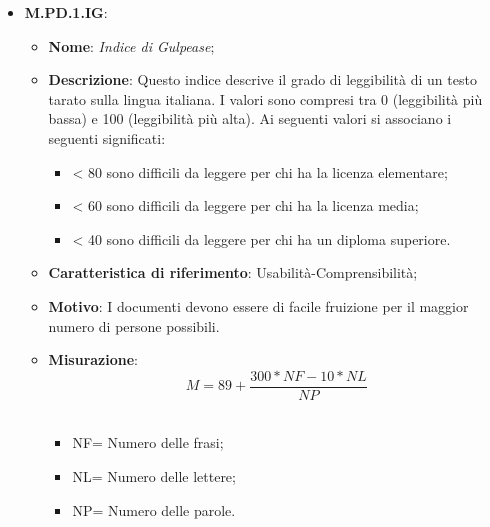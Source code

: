 \documentclass[10pt, a4paper]{article}
\begin{document}
\begin{itemize}
     \item \textbf{M.PD.1.IG}:
    \begin{itemize}
        \item \textbf{Nome}: \textit{Indice di Gulpease\pg};
        \item \textbf{Descrizione}: Questo indice descrive il grado di leggibilità di un testo tarato sulla lingua italiana. I valori sono compresi tra 0 (leggibilità più bassa) e 100 (leggibilità più alta). Ai seguenti valori si associano i seguenti significati:
        \begin{itemize}
            \item < 80 sono difficili da leggere per chi ha la licenza elementare;
            \item < 60 sono difficili da leggere per chi ha la licenza media;
            \item < 40 sono difficili da leggere per chi ha un diploma superiore.
        \end{itemize}
        \item \textbf{Caratteristica di riferimento}: Usabilità-Comprensibilità;
        \item \textbf{Motivo}: I documenti devono essere di facile fruizione per il maggior numero di persone possibili.
        \item \textbf{Misurazione}: \[M=89 + \frac{300* NF -10* NL}{NP} \] \\
        \begin{itemize}
        \item NF= Numero delle frasi;
        \item NL= Numero delle lettere;
        \item NP= Numero delle parole.\\
        \end{itemize}
        \end{itemize}
        \begin{comment}
       \item Per lo scopo dei documenti e per la formalità
richiesta da essi, capiterà spesso che vengano impiegati termini tecnici che non si possono
sostituire. Anche interrompere la frase a favore di un indice più alto potrebbe spezzarne il
ragionamento o, peggio, storpiarne il contenuto. Infine, usare frasi troppo dirette potrebbe
risultare poco professionale ai fini del documento. Perciò, i documenti saranno valutati da
un essere umano per stabilire se e come il testo potrebbe essere semplificato. I limiti imposti
da tale indice saranno sufficientemente rilassati per accettare frasi un po’ più articolate.
Per migliorare l’utilizzo di questo indice non verrà controllato solamente a livello
\end{comment}



\end{itemize}
\end{document}
